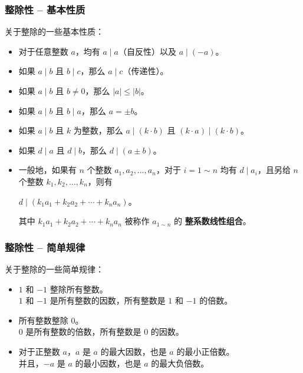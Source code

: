 \documentclass{../pkslide}
\begin{document}
\begin{frame}
  \frametitle{整除性 -- 基本性质}
  
  关于整除的一些基本性质：
  
  \pause
  \begin{itemize}
    \setlength{\itemsep}{2pt}
    \item 对于任意整数 $a$，均有 $a \mid a$（自反性）以及 $a \mid (-a)$。
    \item 如果 $a \mid b$ 且 $b \mid c$，那么 $a \mid c$（传递性）。
      \pause
    \item 如果 $a \mid b$ 且 $b \ne 0$，那么 $|a| \le |b|$。
    \item 如果 $a \mid b$ 且 $b \mid a$，那么 $a = \pm b$。
      \pause
    \item 如果 $a \mid b$ 且 $k$ 为整数，那么 $a \mid (k \cdot b)$ 且 $(k \cdot a) \mid (k \cdot b)$。
    \item 如果 $d \mid a$ 且 $d \mid b$，那么 $d \mid (a \pm b)$。
      \pause
    \item 一般地，如果有 $n$ 个整数 $a_1, a_2, \ldots, a_n$，对于 $i = 1 \sim n$ 均有 $d \mid a_i$，且另给 $n$ 个整数 $k_1, k_2, \ldots, k_n$，则有
      \begin{center}
        $\displaystyle d \mid (k_1 a_1 + k_2 a_2 + \cdots + k_n a_n)$。
      \end{center}
        \pause
      其中 $k_1 a_1 + k_2 a_2 + \cdots + k_n a_n$ 被称作 $a_{1 \sim n}$ 的{\color{red} \textbf{整系数线性组合}}。
  \end{itemize}
\end{frame}

\begin{frame}
  \frametitle{整除性 -- 简单规律}
  
  关于整除的一些简单规律：
  
  \begin{itemize}
    \item<2-> $1$ 和 $-1$ 整除所有整数。\\
      $1$ 和 $-1$ 是所有整数的因数，所有整数是 $1$ 和 $-1$ 的倍数。
    \item<3-> 所有整数整除 $0$。\\
      $0$ 是所有整数的倍数，所有整数是 $0$ 的因数。
    \item<4-> 对于正整数 $a$，$a$ 是 $a$ 的最大因数，也是 $a$ 的最小正倍数。\\
      并且，$-a$ 是 $a$ 的最小因数，也是 $a$ 的最大负倍数。
  \end{itemize}
  
\end{frame}
\end{document}
